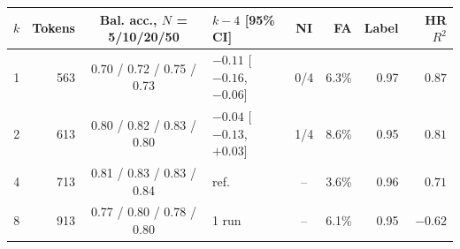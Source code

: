 \begin{tabular}{rrclcrrr}
\toprule
$k$ & Tokens & Bal. acc., $N$ = 5/10/20/50 & $k-4$ [95\% CI] & NI & FA & Label & HR $R^2$ \\
\midrule
1 & 563 & 0.70 / 0.72 / 0.75 / 0.73 & $-0.11$ [$-0.16$, $-0.06$] & 0/4 & 6.3\% & 0.97 & $0.87$ \\
2 & 613 & 0.80 / 0.82 / 0.83 / 0.80 & $-0.04$ [$-0.13$, $+0.03$] & 1/4 & 8.6\% & 0.95 & $0.81$ \\
4 & 713 & 0.81 / 0.83 / 0.83 / 0.84 & ref. & -- & 3.6\% & 0.96 & $0.71$ \\
8 & 913 & 0.77 / 0.80 / 0.78 / 0.80 & 1 run & -- & 6.1\% & 0.95 & $-0.62$ \\
\bottomrule
\end{tabular}
